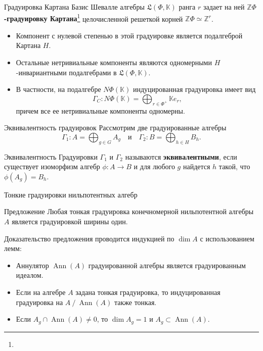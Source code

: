 \documentclass[12pt,aspectratio=169]{beamer}
\DeclareMathOperator{\Ann}{Ann}
\newcommand{\K}{\mathbb{K}}
\newcommand{\quot}[2]{#1\mathbin{/}#2}
\newcommand{\term}[1]{{\color{MainRed}\bfseries #1}}
\newcommand{\sourcefootnote}[1]{\footnote{\slidecite{#1}}}
\begin{document}
\begin{frame}[t]{Градуировка Картана}
    \small
    Базис Шевалле алгебры $\mathfrak{L}(\Phi,\K)$ ранга $r$ задает на ней
    \term{$\mathbb Z\Phi$-градуировку
        Картана}\sourcefootnote{kochetov2013,moody95} целочисленной решеткой корней
    $\mathbb Z\Phi\simeq \mathbb Z^r$.

    \begin{itemize}
        \item Компонент с нулевой степенью в этой градуировке является подалгеброй Картана
              $H$.
        \item Остальные нетривиальные компоненты являются одномерными $H$-инвариантными
              подалгебрами в $\mathfrak L(\Phi,\K)$.
        \item В частности, на подалгебре $N\Phi(\K)$ индуцированная градуировка имеет вид
              \[
                  \Gamma_C\colon N\Phi(\K)=\bigoplus_{r\in\Phi^+}\K e_r,
              \]
              причем все ее нетривиальные компоненты одномерны.
    \end{itemize}
\end{frame}

\begin{frame}[t]{Эквивалентность градуировок}
    Рассмотрим две градуированные алгебры
    \begin{equation}\label{eq:two-graded-algebras}
        \Gamma_1 \colon A = \bigoplus_{g \in G}A_g
        \quad \text{и} \quad
        \Gamma_2 \colon B = \bigoplus_{h \in H}B_h.
    \end{equation}
    \begin{block}{Эквивалентность}
        Градуировки $\Gamma_1$ и $\Gamma_2$ называются \term{эквивалентными}, если существует изоморфизм алгебр $\phi\colon A\to B$ и для любого $g$ найдется $h$ такой, что $\phi(A_g)=B_h$.
    \end{block}
\end{frame}

\begin{frame}[t]{Тонкие градуировки нильпотентных алгебр}
    \begin{block}{Предложение}
        Любая тонкая градуировка конечномерной нильпотентной алгебры $A$ является градуировкой ширины один.
    \end{block}

    Доказательство предложения проводится индукцией по $\dim A$ с использованием
    лемм:

    \begin{itemize}
        \item Аннулятор $\Ann(A)$ градуированной алгебры является градуированным идеалом.

        \item Если на алгебре $A$ задана тонкая градуировка, то индуцированная градуировка на
              $\quot{A}{\Ann(A)}$ также тонкая.

        \item Если $A_g\cap \Ann(A)\ne 0$, то $\dim A_g=1$ и $A_g\subset\Ann(A)$.
    \end{itemize}
\end{frame}
\end{document}
